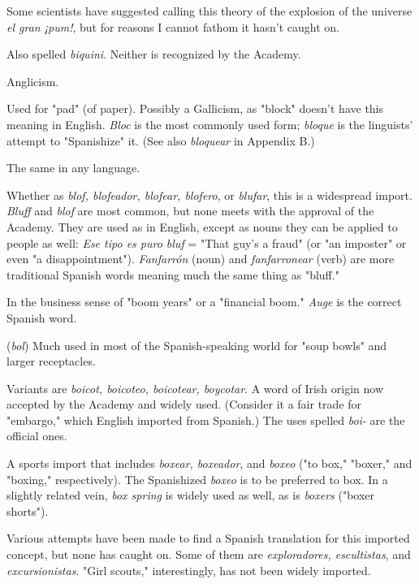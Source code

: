  Some scientists have suggested calling this theory
of the explosion of the universe \emph{el gran ¡pum!}, but for reasons I cannot
fathom it hasn't caught on.

 Also spelled \emph{biquini}. Neither is recognized by the
Academy.

 Anglicism.

 Used for "pad" (of paper). Possibly a Gallicism, as
"block" doesn't have this meaning in English. \emph{Bloc} is the most commonly used form; \emph{bloque} is the linguists' attempt to "Spanishize" it.
(See also \emph{bloquear} in Appendix B.)

 The same in any language.

 Whether as \emph{blof, blofeador, blofear, blofero}, or \emph{blufar},
this is a widespread import. \emph{Bluff} and \emph{blof} are most common, but none
meets with the approval of the Academy. They are used as in English,
except as nouns they can be applied to people as well: \emph{Ese tipo es puro
bluf} = "That guy's a fraud" (or "an imposter" or even "a disappointment"). \emph{Fanfarrón} (noun) and \emph{fanfarronear} (verb) are more traditional
Spanish words meaning much the same thing as "bluff."

 In the business sense of "boom years" or a "financial
boom." \emph{Auge} is the correct Spanish word.

 (\emph{bol}) Much used in most of the Spanish-speaking
world for "soup bowls" and larger receptacles.

 Variants are \emph{boicot, boicoteo, boicotear, boycotar}.
A word of Irish origin now accepted by the Academy and widely used.
(Consider it a fair trade for "embargo," which English imported from
Spanish.) The uses spelled \emph{boi-} are the official ones.

 A sports import that includes \emph{boxear, boxeador}, and
\emph{boxeo} ("to box," "boxer," and "boxing," respectively). The Spanishized
\emph{boxeo} is to be preferred to box. In a slightly related vein, \emph{box spring} is
widely used as well, as is \emph{boxers} ("boxer shorts").

 Various attempts have been made to find a Spanish translation for this imported concept, but none has caught on.
Some of them are \emph{exploradores, escultistas}, and \emph{excursionistas}. "Girl
scouts," interestingly, has not been widely imported.

